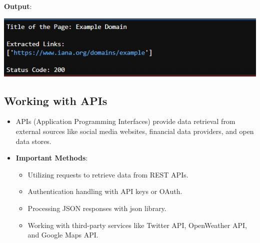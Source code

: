 \documentclass{article}
\begin{document}
\textbf{Output}:

\includegraphics[width=14cm,height=4
cm]{WebScraping_Output.jpeg}
\subsection{Working with APIs}
\begin{itemize}
    \item APIs (Application Programming Interfaces) provide data retrieval from external sources like social media websites, financial data providers, and open data stores.
    \item \textbf{Important Methods}:
    \begin{itemize}
    \item Utilizing requests to retrieve data from REST APIs.
    \item Authentication handling with API keys or OAuth.
    \item Processing JSON responses with json library.
    \item Working with third-party services like Twitter API, OpenWeather API, and Google Maps API.
    \end{itemize}
\end{itemize}
\end{document}
